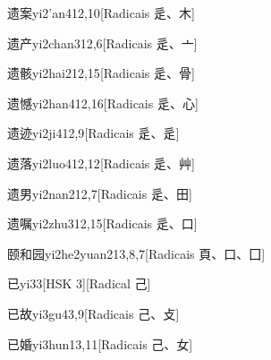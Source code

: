 \begin{entry}{遗案}{yi2'an4}{12,10}[Radicais ⾡、⽊]
\end{entry}

\begin{entry}{遗产}{yi2chan3}{12,6}[Radicais ⾡、⼇]
\end{entry}

\begin{entry}{遗骸}{yi2hai2}{12,15}[Radicais ⾡、⾻]
\end{entry}

\begin{entry}{遗憾}{yi2han4}{12,16}[Radicais ⾡、⼼]
\end{entry}

\begin{entry}{遗迹}{yi2ji4}{12,9}[Radicais ⾡、⾡]
\end{entry}

\begin{entry}{遗落}{yi2luo4}{12,12}[Radicais ⾡、⾋]
\end{entry}

\begin{entry}{遗男}{yi2nan2}{12,7}[Radicais ⾡、⽥]
\end{entry}

\begin{entry}{遗嘱}{yi2zhu3}{12,15}[Radicais ⾡、⼝]
\end{entry}

\begin{entry}{颐和园}{yi2he2yuan2}{13,8,7}[Radicais ⾴、⼝、⼞]
\end{entry}

\begin{entry}{已}{yi3}{3}[HSK 3][Radical ⼰]
\end{entry}

\begin{entry}{已故}{yi3gu4}{3,9}[Radicais ⼰、⽁]
\end{entry}

\begin{entry}{已婚}{yi3hun1}{3,11}[Radicais ⼰、⼥]
\end{entry}

